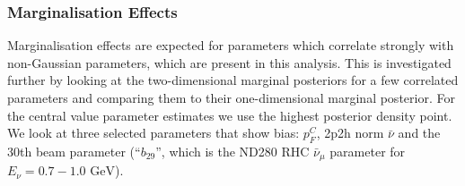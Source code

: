 \subsubsection{Marginalisation Effects}
\label{sec:marginalisation}
Marginalisation effects are expected for parameters which correlate strongly with non-Gaussian parameters, which are present in this analysis. This is investigated further by looking at the two-dimensional marginal posteriors for a few correlated parameters and comparing them to their one-dimensional marginal posterior. For the central value parameter estimates we use the highest posterior density point. We look at three selected parameters that show bias: $p_F^{C}$, 2p2h norm $\bar{\nu}$ and the 30th beam parameter (``$b_{29}$'', which is the ND280 RHC $\bar{\nu}_\mu$ parameter for $E_\nu= 0.7-1.0\text{ GeV}$).

